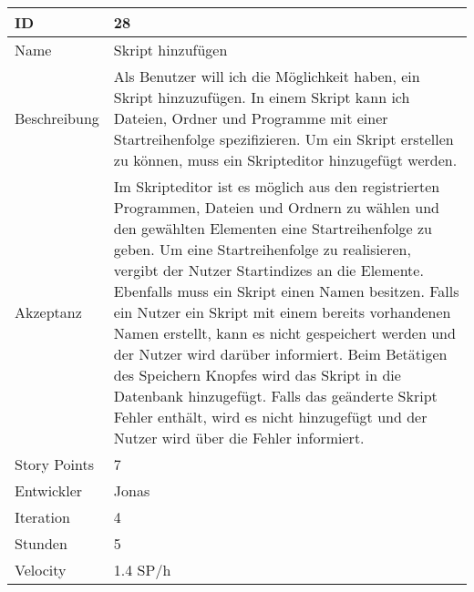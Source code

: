 \begin{table}[htbp]
    \begin{minipage}{\linewidth}
        \setlength{\tymax}{0.5\linewidth}
        \centering
        \small
        \begin{tabulary}{\textwidth}{|l|p{10cm}|} \hline
            ID   &28\\\hline
            Name  &Skript hinzufügen\\\hline
	    Beschreibung&Als Benutzer will ich die Möglichkeit haben, ein Skript hinzuzufügen. In einem Skript kann ich Dateien, Ordner und Programme mit einer Startreihenfolge spezifizieren. Um ein Skript erstellen zu können, muss ein Skripteditor hinzugefügt werden.\\\hline
	    Akzeptanz &Im Skripteditor ist es möglich aus den registrierten Programmen, Dateien und Ordnern zu wählen und den gewählten Elementen eine Startreihenfolge zu geben. Um eine Startreihenfolge zu realisieren, vergibt der Nutzer Startindizes an die Elemente. Ebenfalls muss ein Skript einen Namen besitzen. Falls ein Nutzer ein Skript mit einem bereits vorhandenen Namen erstellt, kann es nicht gespeichert werden und der Nutzer wird darüber informiert. Beim Betätigen des Speichern Knopfes wird das Skript in die Datenbank hinzugefügt. Falls das geänderte Skript Fehler enthält, wird es nicht hinzugefügt und der Nutzer wird über die Fehler informiert.\\\hline
            Story Points&7\\\hline
            Entwickler &Jonas\\\hline
            Iteration &4\\\hline
            Stunden  &5\\\hline
            Velocity &1.4 SP\slash h\\\hline
        \end{tabulary}
    \end{minipage}
\end{table}



